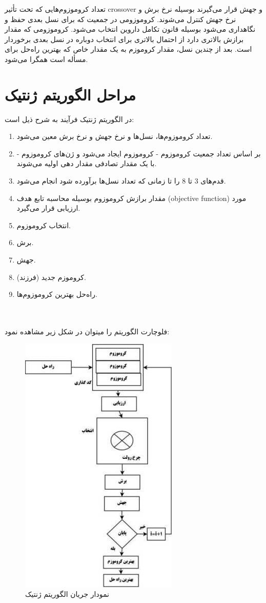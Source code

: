 \documentclass[11pt]{article}
\begin{document}
تعداد کروموزوم‌هایی که تحت تأثیر crossover و جهش قرار می‌گیرند بوسیله نرخ برش و نرخ جهش کنترل می‌شوند. کروموزومی در جمعیت که برای نسل بعدی حفظ و نگاهداری می‌شود بوسیله قانون تکامل داروین انتخاب می‌شود. کروموزومی که مقدار برازش بالاتری دارد از احتمال بالاتری برای انتخاب دوباره در نسل بعدی برخوردار است. بعد از چندین نسل، مقدار کروموزم به یک مقدار خاص که بهترین راه‌حل برای مسأله است همگرا می‌شود.

\section{مراحل الگوریتم ژنتیک}

در الگوریتم ژنتیک فرآیند به شرح ذیل است:
\begin{enumerate}
    \item تعداد کروموزوم‌ها، نسل‌ها و نرخ جهش و نرخ برش معین می‌شود.
    \item بر اساس تعداد جمعیت کروموزوم - کروموزوم ایجاد می‌شود و ژن‌های کروموزوم - با یک مقدار تصادفی مقدار دهی اولیه می‌شوند.
    \item قدم‌های 3 تا 8 را تا زمانی که تعداد نسل‌ها برآورده شود انجام می‌شود.
    \item مقدار برازش کروموزوم بوسیله محاسبه تابع هدف (objective function) مورد ارزیابی قرار می‌گیرد.
    \item انتخاب کروموزوم.
    \item برش.
    \item جهش.
    \item کروموزم جدید (فرزند).
    \item راه‌حل بهترین کروموزوم‌ها.
\end{enumerate}
\\
\\
فلوچارت الگوریتم را میتوان در شکل زیر مشاهده نمود:

\begin{figure}[h]
    \centerline{\includegraphics[scale=1.5]{picture.jpg}}
    \caption{نمودار جریان الگوریتم ژنتیک}
    \label{fig}
\end{figure}
\end{document}
